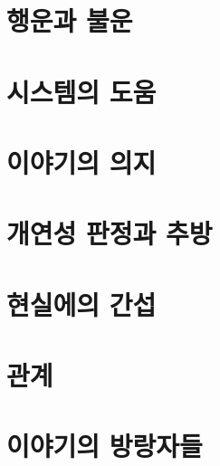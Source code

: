 \documentclass{report}
\begin{document}
	\section{행운과 불운}
		
	
	\section{시스템의 도움}
		
	
	\section{이야기의 의지}
		
	
	\section{개연성 판정과 추방}
		
	
	\section{현실에의 간섭}
		
	
	\section{관계}
		
	
\ifprintout\else
	\section{이야기의 방랑자들}
		
\fi
\end{document}
